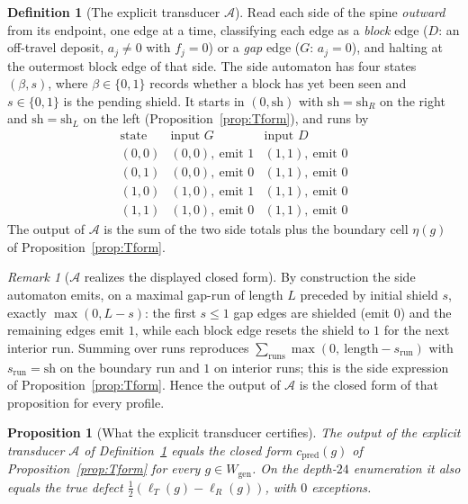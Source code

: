 \documentclass[11pt]{article}
\theoremstyle{plain}
\newtheorem{proposition}[theorem]{Proposition}
\theoremstyle{definition}
\newtheorem{definition}[theorem]{Definition}
\theoremstyle{remark}
\newtheorem{remark}[theorem]{Remark}
\begin{document}
\begin{definition}[The explicit transducer $\mathcal{A}$]
\label{def:transducer}
Read each side of the spine \emph{outward} from its endpoint, one edge at a
time, classifying each edge as a \emph{block} edge ($D$: an off-travel deposit,
$a_j\ne0$ with $f_j=0$) or a \emph{gap} edge ($G$: $a_j=0$), and halting at the
outermost block edge of that side. The side automaton has four states
$(\beta,s)$, where $\beta\in\{0,1\}$ records whether a block has yet been seen
and $s\in\{0,1\}$ is the pending shield. It starts in $(0,\mathrm{sh})$ with
$\mathrm{sh}=\mathrm{sh}_R$ on the right and $\mathrm{sh}=\mathrm{sh}_L$ on the
left \textup{(Proposition~\ref{prop:Tform})}, and runs by
\[
\renewcommand{\arraystretch}{1.15}
\begin{array}{c|cc}
\text{state} & \text{input }G & \text{input }D\\\hline
(0,0) & (0,0),\ \text{emit }1 & (1,1),\ \text{emit }0\\
(0,1) & (0,0),\ \text{emit }0 & (1,1),\ \text{emit }0\\
(1,0) & (1,0),\ \text{emit }1 & (1,1),\ \text{emit }0\\
(1,1) & (1,0),\ \text{emit }0 & (1,1),\ \text{emit }0
\end{array}
\]
The output of $\mathcal{A}$ is the sum of the two side totals plus the boundary
cell $\eta(g)$ of Proposition~\ref{prop:Tform}.
\end{definition}

\begin{remark}[$\mathcal{A}$ realizes the displayed closed form]
\label{rem:A-tform}
By construction the side automaton emits, on a maximal gap-run of length $L$
preceded by initial shield $s$, exactly $\max(0,L-s)$: the first $s\le1$ gap
edges are shielded (emit $0$) and the remaining edges emit $1$, while each block
edge resets the shield to $1$ for the next interior run. Summing over runs
reproduces $\sum_{\text{runs}}\max(0,\ \text{length}-s_{\text{run}})$ with
$s_{\text{run}}=\mathrm{sh}$ on the boundary run and $1$ on interior runs; this
is the side expression of Proposition~\ref{prop:Tform}. Hence the output of
$\mathcal{A}$ is the closed form of that proposition for every profile.
\end{remark}

\begin{proposition}[What the explicit transducer certifies]
\label{thm:Bproved}
The output of the explicit transducer $\mathcal{A}$ of
Definition~\textup{\ref{def:transducer}} equals the closed form
$c_{\mathrm{pred}}(g)$ of Proposition~\textup{\ref{prop:Tform}} for every
$g\in W_{\mathrm{gen}}$. On the depth-$24$ enumeration it also equals the true
defect $\tfrac12(\ell_T(g)-\ell_R(g))$, with $0$ exceptions.
\end{proposition}
\end{document}
